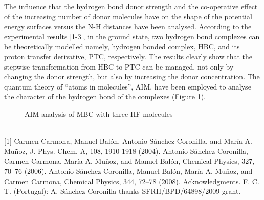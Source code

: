 The influence that the hydrogen bond donor strength and the co-operative
effect of the increasing number of donor molecules have on the shape of the potential
energy surfaces versus the N-H distances have been analysed. According to the
experimental results [1-3], in the ground state, two hydrogen bond complexes can be
theoretically modelled namely, hydrogen bonded complex, HBC, and its proton
transfer derivative, PTC, respectively. The results clearly show that the stepwise
transformation from HBC to PTC can be managed, not only by changing the donor
strength, but also by increasing the donor concentration. The quantum theory of
“atoms in molecules”, AIM, have been employed to analyse the character of the
hydrogen bond of the complexes (Figure 1).
\\
\begin{figure}[h]
 \centerline{}
 \caption[]{AIM analysis of MBC with three HF molecules}\label{figure 1}
\end{figure}
\\
{\footnotesize
[1] Carmen Carmona, Manuel Balón, Antonio Sánchez-Coronilla, and María A. Muñoz, J. Phys.
Chem. A, 108, 1910-1918 (2004).
\newline
[2] Antonio Sánchez-Coronilla, Carmen Carmona, María A. Muñoz, and Manuel Balón, Chemical
Physics, 327, 70–76 (2006).
\newline
[3] Antonio Sánchez-Coronilla, Manuel Balón, María A. Muñoz, and Carmen Carmona, Chemical
Physics, 344, 72–78 (2008).
\newline
Acknowledgments. F. C. T. (Portugal): A. Sánchez-Coronilla thanks SFRH/BPD/64898/2009 grant.
}

\newpage
\setcounter{figure}{0}
